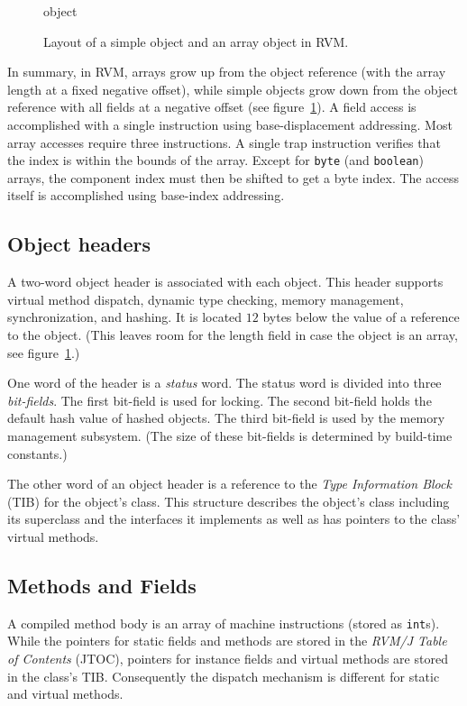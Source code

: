 \begin{figure}[htb]
\begin{gif}{object}
\vbox{
\hbox{}
}\hfil
\end{gif}
\caption{Layout of a simple object and an array object in RVM.}
\label{fig:objects}
\end{figure}

In summary, in RVM, arrays grow up from the object reference (with the
array length at a fixed negative offset), while simple objects grow
down from the object reference with all fields at a negative offset
(see figure~\ref{fig:objects}).  A field access is accomplished with a
single instruction using base-displacement addressing.  Most array
accesses require three instructions.  A single trap instruction
verifies that the index is within the bounds of the array.  Except for
{\tt byte} (and {\tt boolean}) arrays, the component index must then
be shifted to get a byte index.  The access itself is accomplished
using base-index addressing.

\subsection{Object headers} \label{sssec:headers}
A two-word object header is associated with each object.  This header
supports virtual method dispatch, dynamic type checking, memory
management, synchronization, and hashing.  It is located $12$ bytes
below the value of a reference to the object.  (This leaves room for
the length field in case the object is an array, see
figure~\ref{fig:objects}.)

One word of the header is a {\em status} word.  The status word is
divided into three {\em bit-fields}.  The first bit-field is used for
locking.  The second bit-field holds
the default hash value of hashed objects.  The third bit-field is used
by the memory management subsystem.  (The size of these bit-fields is
determined by build-time constants.)

The other word of an object header is a reference to the {\em Type
Information Block} (TIB) for the object's class. This structure describes
the object's class including its superclass and the interfaces it implements
as well as has pointers to the class' virtual methods.

\subsection{Methods and Fields}\label{sssec:methods}
A compiled method body is an array of machine instructions (stored as
{\tt int}s). 
While the pointers for static fields and methods are stored in the 
{\em RVM/J Table of Contents} (JTOC),
pointers for instance fields and virtual methods are stored in the class's TIB.
Consequently the dispatch mechanism is different for static and virtual 
methods.


